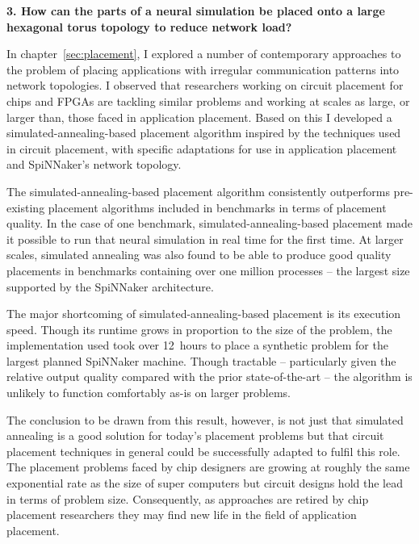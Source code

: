 		\vspace*{1.0em}
		\noindent%
		\textbf{3. How can the parts of a neural simulation be placed onto a large
		hexagonal torus topology to reduce network load?}
		
		In chapter~\ref{sec:placement}, I explored a number of contemporary
		approaches to the problem of placing applications with irregular
		communication patterns into network topologies. I observed that researchers
		working on circuit placement for chips and FPGAs are tackling similar
		problems and working at scales as large, or larger than, those faced in
		application placement. Based on this I developed a
		simulated-annealing-based placement algorithm inspired by the techniques
		used in circuit placement, with specific adaptations for use in application
		placement and SpiNNaker's network topology.
		
		The simulated-annealing-based placement algorithm consistently outperforms
		pre-existing placement algorithms included in benchmarks in terms of
		placement quality.  In the case of one benchmark, simulated-annealing-based
		placement made it possible to run that neural simulation in real time for
		the first time.  At larger scales, simulated annealing was also found to be
		able to produce good quality placements in benchmarks containing over one
		million processes -- the largest size supported by the SpiNNaker
		architecture.
		
		The major shortcoming of simulated-annealing-based placement is its
		execution speed. Though its runtime grows in proportion to the size of the
		problem, the implementation used took over 12~hours to place a synthetic
		problem for the largest planned SpiNNaker machine. Though tractable --
		particularly given the relative output quality compared with the prior
		state-of-the-art -- the algorithm is unlikely to function comfortably as-is
		on larger problems.
		
		The conclusion to be drawn from this result, however, is not just that
		simulated annealing is a good solution for today's placement problems but
		that circuit placement techniques in general could be successfully adapted
		to fulfil this role. The placement problems faced by chip designers are
		growing at roughly the same exponential rate as the size of super computers
		but circuit designs hold the lead in terms of problem size. Consequently,
		as approaches are retired by chip placement researchers they may find new
		life in the field of application placement.
		
